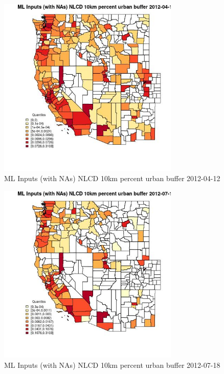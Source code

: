 \clearpage 

\begin{figure} 
\centering  
\includegraphics[width=0.77\textwidth]{Code_Outputs/Report_ML_input_PM25_Step4_part_e_de_duplicated_aves_compiled_2019-05-14wNAs_CountyNLCD_10km_percent_urban_bufferMean2012-04-12_2012-04-12.jpg} 
\caption{\label{fig:Report_ML_input_PM25_Step4_part_e_de_duplicated_aves_compiled_2019-05-14wNAsCountyNLCD_10km_percent_urban_bufferMean2012-04-12_2012-04-12}ML Inputs (with NAs) NLCD 10km percent urban buffer 2012-04-12} 
\end{figure} 
 

\begin{figure} 
\centering  
\includegraphics[width=0.77\textwidth]{Code_Outputs/Report_ML_input_PM25_Step4_part_e_de_duplicated_aves_compiled_2019-05-14wNAs_CountyNLCD_10km_percent_urban_bufferMean2012-07-18_2012-07-18.jpg} 
\caption{\label{fig:Report_ML_input_PM25_Step4_part_e_de_duplicated_aves_compiled_2019-05-14wNAsCountyNLCD_10km_percent_urban_bufferMean2012-07-18_2012-07-18}ML Inputs (with NAs) NLCD 10km percent urban buffer 2012-07-18} 
\end{figure} 
 

